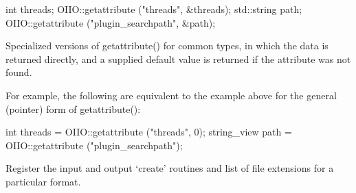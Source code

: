 \begin{code}
      int threads;
      OIIO::getattribute ("threads", &threads);
      std::string path;
      OIIO::getattribute ("plugin_searchpath", &path);
\end{code}
\apiend

 
Specialized versions of {\cf getattribute()} for common types, in which the
data is returned directly, and a supplied default value is returned if the
attribute was not found.

For example, the following are equivalent to the example above for the
general (pointer) form of {\cf getattribute()}:

\begin{code}
      int threads = OIIO::getattribute ("threads", 0);
      string_view path = OIIO::getattribute ("plugin_searchpath");
\end{code}
\apiend


Register the input and output `create' routines and list of file
extensions for a particular format.
\apiend



\chapwidthend
